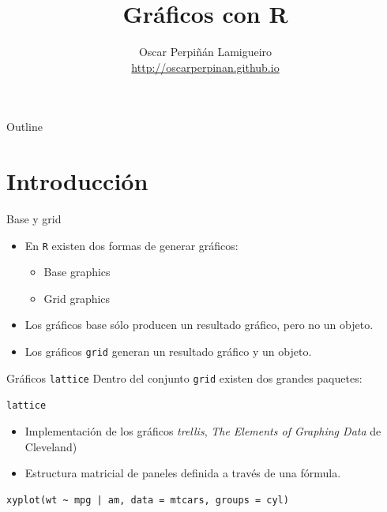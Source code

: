 \documentclass[xcolor={usenames,svgnames,dvipsnames}]{beamer}
\author{Oscar Perpiñán Lamigueiro \\ \url{http://oscarperpinan.github.io}}
\date{}
\title{Gráficos con R}
\begin{document}
\maketitle
\begin{frame}{Outline}
\tableofcontents
\end{frame}



\section{Introducción}
\label{sec-1}
\begin{frame}[fragile,label=sec-1-1]{Base y grid}
 \begin{itemize}
\item En \texttt{R} existen dos formas de generar gráficos:
\begin{itemize}
\item Base graphics
\item Grid graphics
\end{itemize}
\item Los gráficos base sólo producen un resultado gráfico, pero no un objeto.
\item Los gráficos \texttt{grid} generan un resultado gráfico \alert{y} un objeto.
\end{itemize}
\end{frame}

\begin{frame}[fragile,label=sec-1-2]{Gráficos \texttt{lattice}}
 Dentro del conjunto \texttt{grid} existen dos grandes paquetes:

\begin{block}{\texttt{lattice}}
\begin{itemize}
\item Implementación de los gráficos \emph{trellis}, \emph{The Elements of Graphing Data} de Cleveland)

\item Estructura matricial de paneles definida a través de una fórmula.
\end{itemize}

\lstset{language=R,label= ,caption= ,numbers=none}
\begin{lstlisting}
xyplot(wt ~ mpg | am, data = mtcars, groups = cyl)
\end{lstlisting}
\end{block}
\end{frame}
\end{document}
